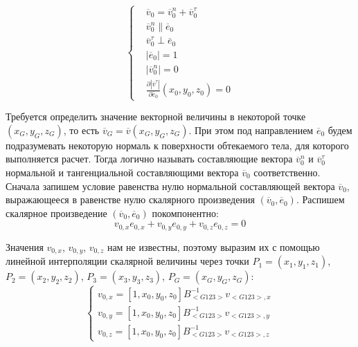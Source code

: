 \begin{equation}
	\left\{
		\begin{aligned}
			& \overline{v}_0 = \overline{v}_0^n + \overline{v}_0^{\tau} \\
			& \overline{v}_0^n \parallel \overline{e}_0 \\
			& \overline{v}_0^{\tau} \perp \overline{e}_0 \\
			& |\overline{e}_0| = 1 \\
			& |\overline{v}_0^n| = 0 \\
			& \frac{\partial{|\overline{v}^{\tau}|}}{\partial{\overline{e}_0}}(x_0, y_0, z_0) = 0 
		\end{aligned}
	\right.
\end{equation}

Требуется определить значение векторной величины в некоторой точке $(x_G, y_G, z_G)$, то есть $\overline{v}_G = \overline{v}(x_G, y_G, z_G)$.
При этом под направлением $\overline{e}_0$ будем подразумевать некоторую нормаль к поверхности обтекаемого тела, для которого выполняется расчет.
Тогда логично называть составляющие вектора $\overline{v}_0^n$ и $\overline{v}_0^{\tau}$ нормальной и тангенциальной составляющими вектора $\overline{v}_0$ соответственно.
Сначала запишем условие равенства нулю нормальной составляющей вектора $\overline{v}_0$, выражающееся в равенстве нулю скалярного произведения $(\overline{v}_0, \overline{e}_0)$. 
Распишем скалярное произведение $(\overline{v}_0, \overline{e}_0)$ покомпонентно:
\begin{equation}
	v_{0,x}e_{0,x} + v_{0,y}e_{0,y} + v_{0,z}e_{0,z} = 0
\end{equation}

Значения $v_{0,x}$, $v_{0,y}$, $v_{0,z}$ нам не известны, поэтому выразим их с помощью линейной интерполяции скалярной величины через точки $P_1 = (x_1, y_1, z_1)$, $P_2 = (x_2, y_2, z_2)$, $P_3 = (x_3, y_3, z_3)$, $P_G = (x_G, y_G, z_G)$:
\begin{equation}
	\left\{
		\begin{aligned}
			v_{0,x} = [1, x_0, y_0, z_0] B_{<G123>}^{-1} v_{<G123>,x} \\
			v_{0,y} = [1, x_0, y_0, z_0] B_{<G123>}^{-1} v_{<G123>,y} \\
			v_{0,z} = [1, x_0, y_0, z_0] B_{<G123>}^{-1} v_{<G123>,z}
		\end{aligned}
	\right.
\end{equation}

